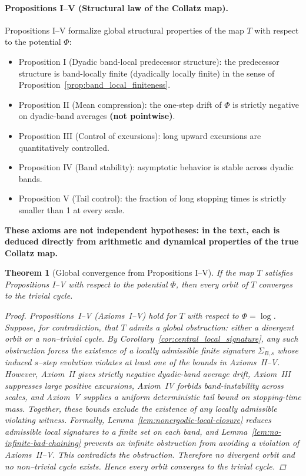 \documentclass[preprint,12pt]{elsarticle}
\newtheorem{theorem}{Theorem}
\begin{document}
\paragraph{Propositions I--V (Structural law of the Collatz map).}
Propositions I--V formalize global structural properties of the map \(T\) with respect to the potential \(\Phi\):
\begin{itemize}
\item Proposition I (Dyadic band-local predecessor structure): the predecessor structure is band-locally finite (dyadically locally finite) in the sense of Proposition~\ref{prop:band_local_finiteness}.
\item Proposition II (Mean compression): the one-step drift of $\Phi$ is strictly negative on dyadic-band averages \textbf{(not pointwise)}.
\item Proposition III (Control of excursions): long upward excursions are quantitatively controlled.
\item Proposition IV (Band stability): asymptotic behavior is stable across dyadic bands.
\item Proposition V (Tail control): the fraction of long stopping times is strictly smaller than 1 at every scale.
\end{itemize}
\textbf{These axioms are not independent hypotheses: in the text, each is deduced directly from arithmetic and dynamical properties of the true Collatz map.}

\begin{theorem}[Global convergence from Propositions I--V]
\label{thm:global-convergence-from-I-V}
If the map \(T\) satisfies Propositions I--V with respect to the potential \(\Phi\), then every orbit of \(T\) converges to the trivial cycle.
\begin{proof}
Propositions~I--V (Axioms~I--V) hold for $T$ with respect to $\Phi=\log$. Suppose, for contradiction, that $T$ admits a global obstruction: either a divergent orbit or a non--trivial cycle.
By Corollary~\ref{cor:central_local_signature}, any such obstruction forces the existence of a locally admissible finite signature $\Sigma_{B,s}$ whose induced $s$--step evolution violates at least one of the bounds in Axioms~II--V.
However, Axiom~II gives strictly negative dyadic-band average drift, Axiom~III suppresses large positive excursions, Axiom~IV forbids band-instability across scales, and Axiom~V supplies a uniform deterministic tail bound on stopping-time mass. Together, these bounds exclude the existence of any locally admissible violating witness.
Formally, Lemma~\ref{lem:nonergodic-local-closure} reduces admissible local signatures to a finite set on each band, and Lemma~\ref{lem:no-infinite-bad-chaining} prevents an infinite obstruction from avoiding a violation of Axioms~II--V.
This contradicts the obstruction. Therefore no divergent orbit and no non--trivial cycle exists. Hence every orbit converges to the trivial cycle.
\end{proof}
\end{theorem}
\end{document}

